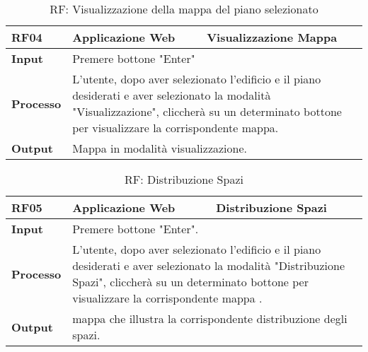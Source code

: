 \begin{table}[ht]
\caption{RF: Visualizzazione della mappa del piano selezionato}
\begin{center}
\begin{tabular}{|p{3cm}|p{4cm}|p{5cm}|}
\hline
\textbf{RF04}&\textbf{Applicazione Web}&\textbf{Visualizzazione Mappa}\\
\hline
\textbf{Input}&\multicolumn{2}{|p{9cm}|}{
Premere bottone "Enter" }\\
\hline
\textbf{Processo}&\multicolumn{2}{|p{9cm}|}{
L'utente, dopo aver selezionato l'edificio e il piano desiderati e aver selezionato la modalit\`a "Visualizzazione", cliccher\`a su un determinato bottone per visualizzare la corrispondente mappa.
}\\
\hline
\textbf{Output}&\multicolumn{2}{|p{9cm}|}{
Mappa in modalit\`a visualizzazione.
}\\
\hline
\end{tabular}
\end{center}
\label{Visualizzazione mappa}
\end{table}
\begin{table}[ht]
\caption{RF: Distribuzione Spazi}
\begin{center}
\begin{tabular}{|p{3cm}|p{4cm}|p{5cm}|}
\hline
\textbf{RF05}&\textbf{Applicazione Web}&\textbf{Distribuzione Spazi}\\
\hline
\textbf{Input}&\multicolumn{2}{|p{9cm}|}{
Premere bottone "Enter".}\\
\hline
\textbf{Processo}&\multicolumn{2}{|p{9cm}|}{
L'utente, dopo aver selezionato l'edificio e il piano desiderati e aver selezionato la modalit\`a "Distribuzione Spazi", cliccher\`a su un determinato bottone per visualizzare la corrispondente mappa .
}\\
\hline
\textbf{Output}&\multicolumn{2}{|p{9cm}|}{
mappa che illustra la corrispondente distribuzione degli spazi.
}\\
\hline
\end{tabular}
\end{center}
\label{Distribuzione Spazi}
\end{table}

